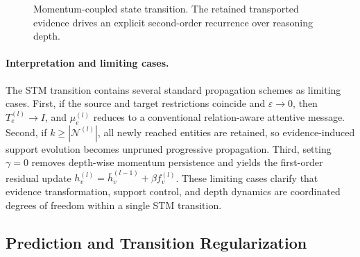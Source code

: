 \documentclass[a4paper,fleqn]{cas-sc}
\begin{document}
\begin{figure}[pos=htbp]
\centering
{}
\caption{Momentum-coupled state transition. The retained transported evidence
drives an explicit second-order recurrence over reasoning depth.}
\label{fig:momentum_evolution}
\end{figure}
\FloatBarrier

\paragraph{Interpretation and limiting cases.}
The STM transition contains several standard propagation schemes as limiting
cases. First, if the source and target restrictions coincide and
$\varepsilon\rightarrow0$, then $T_e^{(l)}\rightarrow I$, and
$\mu_e^{(l)}$ reduces to a conventional relation-aware attentive message.
Second, if $k\geq|\mathcal{N}^{(l)}|$, all newly reached entities are retained,
so evidence-induced support evolution becomes unpruned progressive propagation.
Third, setting $\gamma=0$ removes depth-wise momentum persistence and yields the
first-order residual update
$h_v^{(l)}=\bar h_v^{(l-1)}+\beta f_v^{(l)}$.
These limiting cases clarify that evidence transformation, support control, and
depth dynamics are coordinated degrees of freedom within a single STM
transition.

\subsection{Prediction and Transition Regularization}\label{subsec:objective}
\end{document}
